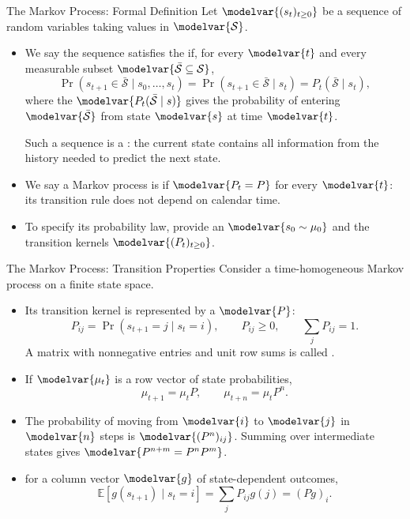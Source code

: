 \begin{frame}{The Markov Process: Formal Definition}
\small
Let \(\modelvar{(s_t)_{t\geq0}}\) be a sequence of random variables taking values in \(\modelvar{\mathcal S}\).
\begin{itemize}
  \item We say the sequence satisfies the  if, for every \(\modelvar{t}\) and every measurable subset \(\modelvar{\bar{\mathcal S}\subseteq\mathcal S}\),
  \[\Pr(s_{t+1}\in\bar{\mathcal S}\mid s_0,\ldots,s_t)
    =\Pr(s_{t+1}\in\bar{\mathcal S}\mid s_t)
    =P_t(\bar{\mathcal S}\mid s_t),\]
  where the  \(\modelvar{P_t(\bar{\mathcal S}\mid s)}\) gives the probability of entering \(\modelvar{\bar{\mathcal S}}\) from state \(\modelvar{s}\) at time \(\modelvar{t}\).
  \par Such a sequence is a : the current state contains all information from the history needed to predict the next state.
  \item We say a Markov process is  if \(\modelvar{P_t=P}\) for every \(\modelvar{t}\): its transition rule does not depend on calendar time.
  \item To specify its probability law, provide an  \(\modelvar{s_0\sim\mu_0}\) and the transition kernels \(\modelvar{(P_t)_{t\geq0}}\).
\end{itemize}
\end{frame}

\begin{frame}{The Markov Process: Transition Properties}
\small
Consider a time-homogeneous Markov process on a finite state space.
\begin{itemize}
  \item Its transition kernel is represented by a  \(\modelvar{P}\):
  \[P_{ij}=\Pr(s_{t+1}=j\mid s_t=i),\qquad P_{ij}\geq0,\qquad\sum_jP_{ij}=1.\]
  A matrix with nonnegative entries and unit row sums is called .
  \item If \(\modelvar{\mu_t}\) is a row vector of state probabilities,
  \[\mu_{t+1}=\mu_tP,\qquad \mu_{t+n}=\mu_tP^n.\]
  \item The probability of moving from \(\modelvar{i}\) to \(\modelvar{j}\) in \(\modelvar{n}\) steps is \(\modelvar{(P^n)_{ij}}\).
  Summing over intermediate states gives \(\modelvar{P^{n+m}=P^nP^m}\).
  \item {} for a column vector \(\modelvar{g}\) of state-dependent outcomes,
  \[\mathbb E[g(s_{t+1})\mid s_t=i]=\sum_jP_{ij}g(j)=(Pg)_i.\]
\end{itemize}
\end{frame}

